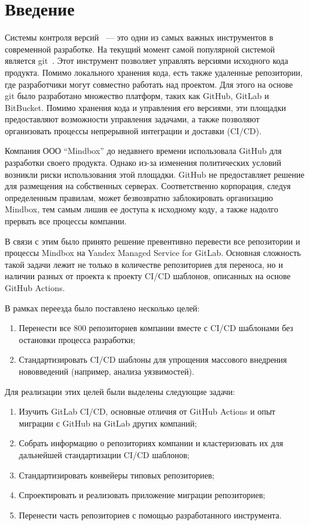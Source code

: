 \chapter*{Введение}

Системы контроля версий~\cite{vcs} — это одни из самых важных инструментов в современной разработке.
На текущий момент самой популярной системой является git~\cite{git}.
Этот инструмент позволяет управлять версиями исходного кода продукта.
Помимо локального хранения кода, есть также удаленные репозитории, где разработчики могут совместно работать над проектом.
Для этого на основе git было разработано множество платформ, таких как GitHub\cite{github}, GitLab\cite{gitlab} и BitBucket\cite{bitbucket}.
Помимо хранения кода и управления его версиями, эти площадки предоставляют возможности управления задачами,
а также позволяют организовать процессы непрерывной интеграции и доставки (CI/CD)\cite{ci-cd}.

Компания ООО \enquote{Mindbox}\cite{mindbox} до недавнего времени использовала GitHub для разработки своего продукта.
Однако из-за изменения политических условий возникли риски использования этой площадки.
GitHub не предоставляет решение для размещения на собственных серверах.
Соответственно корпорация, следуя определенным правилам, может безвозвратно заблокировать организацию Mindbox,
тем самым лишив ее доступа к исходному коду, а также надолго прервать все процессы компании.

В связи с этим было принято решение превентивно перевести все репозитории и процессы Mindbox на Yandex Managed Service for GitLab\cite{yc-managed-gitlab}.
Основная сложность такой задачи лежит не только в количестве репозиториев для переноса,
но и наличии разных от проекта к проекту CI/CD шаблонов, описанных на основе GitHub Actions.

В рамках переезда было поставлено несколько целей:
\begin{enumerate}
  \item Перенести все 800 репозиториев компании вместе с CI/CD шаблонами без остановки процесса разработки;
  \item Стандартизировать CI/CD шаблоны для упрощения массового внедрения нововведений (например, анализа уязвимостей).
\end{enumerate}

Для реализации этих целей были выделены следующие задачи:
\begin{enumerate}
  \item Изучить GitLab CI/CD, основные отличия от GitHub Actions и опыт миграции с GitHub на GitLab других компаний;
  \item Собрать информацию о репозиториях компании и кластеризовать их для дальнейшей стандартизации CI/CD шаблонов;
  \item Стандартизировать конвейеры типовых репозиториев;
  \item Спроектировать и реализовать приложение миграции репозиториев;
  \item Перенести часть репозиториев с помощью разработанного инструмента.
\end{enumerate}
